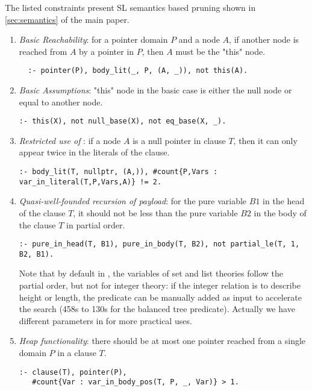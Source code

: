 The listed constraints present SL semantics based pruning shown in \autoref{sec:semantics} of the main paper.
%
\begin{enumerate}
\item \emph{Basic Reachability}: for a pointer domain $P$ and a node $A$, if another node is reached from $A$ by a pointer in $P$, then $A$ must be the "this" node.
\begin{verbatim}
  :- pointer(P), body_lit(_, P, (A, _)), not this(A).
\end{verbatim}
%
\item \emph{Basic Assumptions}: "this" node in the basic case is either the null node or equal to another node.
\begin{verbatim}
:- this(X), not null_base(X), not eq_base(X, _).
\end{verbatim}
%
\item \emph{Restricted use of} : if a node $A$ is a null pointer in clause $T$, then it can only appear twice in the literals of the clause.
\begin{verbatim}
:- body_lit(T, nullptr, (A,)), #count{P,Vars : var_in_literal(T,P,Vars,A)} != 2.
\end{verbatim}
%
\item \emph{Quasi-well-founded recursion of payload}: for the pure variable $B1$ in the head of the clause $T$, it should not be less than the pure variable $B2$ in the body of the clause $T$ in partial order.
\begin{verbatim}
:- pure_in_head(T, B1), pure_in_body(T, B2), not partial_le(T, 1, B2, B1).
\end{verbatim}
Note that by default in \tool, the variables of set and list theories follow the partial order, but not for integer theory: if the integer relation is to describe height or length, the  predicate can be manually added as input to accelerate the search (458s to 130s for the balanced tree predicate). Actually we have different parameters in \tool for more practical uses.
%
\item \emph{Heap functionality}: there should be at most one pointer reached from a single domain $P$ in a clause $T$.
\begin{verbatim}
:- clause(T), pointer(P),
   #count{Var : var_in_body_pos(T, P, _, Var)} > 1.
\end{verbatim}
%
\end{enumerate}
%


